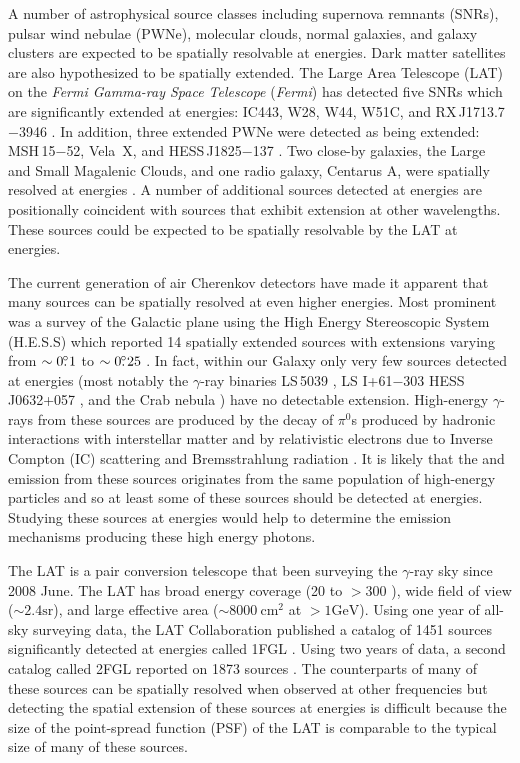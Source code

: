 \documentclass[12pt,preprint]{aastex}
\newcommand{\mev}{\text{MeV}\xspace}
\newcommand{\gev}{\text{GeV}\xspace}
\newcommand{\tev}{\text{TeV}\xspace}
\newcommand{\sr}{\text{sr}\xspace}
\newcommand{\cm}{\text{cm}\xspace}
\newcommand{\fermi}{\textit{Fermi}\xspace}
\newcommand{\hl}[1]{#1}
\begin{document}
\hl{

A number of astrophysical source classes including supernova remnants
(SNRs), pulsar wind nebulae (PWNe), molecular clouds, normal galaxies,
and galaxy clusters are expected to be spatially resolvable at
\gev energies.  Dark matter satellites are also hypothesized to
be spatially extended.  The Large Area Telescope
(LAT) on the {\em \fermi Gamma-ray Space Telescope} (\fermi) has
detected five SNRs which are significantly extended
at \gev energies: IC443, W28, W44, W51C, and RX\,J1713.7$-$3946
\citep{ic443,w28,w44,w51c,rx_j1713_lat}. In addition, three extended
PWNe were detected as being extended: MSH\,15$-$52, Vela~X, and
HESS\,J1825$-$137 \citep{msh1552,velax,fermi_hess_j1825}. Two
close-by galaxies, the Large and Small Magalenic Clouds, and one
radio galaxy, Centarus A, were spatially resolved at \gev energies
\citep{lmc,smc,cen_a_lat}.  A number of additional sources detected
at \gev energies are positionally coincident with sources that exhibit
extension at other wavelengths. These sources could be expected to be spatially
resolvable by the LAT at \gev energies.

The current generation of air Cherenkov detectors have
made it apparent that many sources can be spatially resolved
at even higher energies.
Most
prominent was a survey of the Galactic plane using the High Energy
Stereoscopic System (H.E.S.S) which reported 14 spatially extended
sources with extensions varying from $\sim0\mbox{$.\!\!^\circ$}1$ to $\sim0\mbox{$.\!\!^\circ$}25$
\citep{hess_plane_survey}.  In fact, within our Galaxy only very few
sources detected at \tev energies (most notably the $\gamma$-ray binaries
LS\,5039 \citep{HESSLS5039}, LS I+61$-$303 \citep{MAGICLSI, VERITASLSI}
HESS\,J0632+057 \citep{HESS0632}, and the Crab nebula \citep{crab_weekes})
have no detectable extension.  High-energy $\gamma$-rays from
these sources are produced by the decay of $\pi^0$s produced by hadronic
interactions with interstellar matter and by relativistic electrons
due to Inverse Compton (IC) scattering and Bremsstrahlung radiation
\citep{blandford_and_eichler_1987}.  It is likely that the \gev and
\tev emission from these sources originates from the same population of
high-energy particles and so at least some of these sources should be
detected at \gev energies.  Studying 
these \tev sources at \gev energies would help to
determine the emission mechanisms producing these high energy photons.

The LAT is a pair conversion telescope that been surveying the
$\gamma$-ray sky since 2008 June.  The LAT has broad energy coverage
(20 \mev to $>300$ \gev), wide field of view ($\sim 2.4 \sr$), and large
effective area ($\sim 8000\ \cm^2$ at $>1 \gev$).  
Using one year of all-sky surveying data, the LAT Collaboration published
a catalog of 1451 sources significantly detected at \gev energies called 1FGL \citep{first_cat}.
Using two years of data, a second catalog called 2FGL reported on 1873
sources \citep{second_cat}.
The counterparts of many of these sources can be spatially resolved
when observed at other frequencies but detecting the spatial extension
of these sources at \gev energies is difficult because the size of the
point-spread function (PSF) of the LAT is comparable to the typical size
of many of these sources.

}
\end{document}
